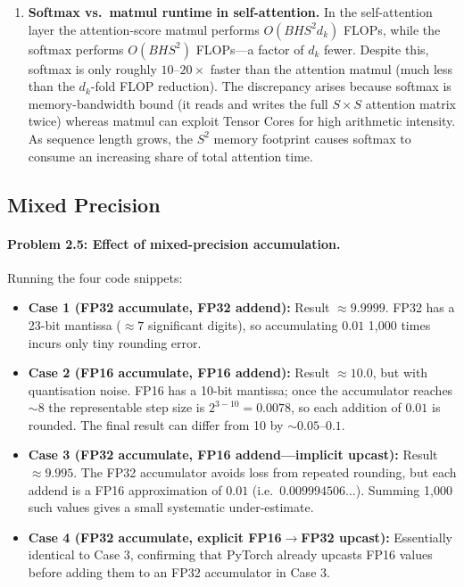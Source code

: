 \documentclass[11pt]{article}
\begin{document}
\begin{enumerate}
  \item \textbf{Softmax vs.\ matmul runtime in self-attention.}
        In the self-attention layer the attention-score matmul performs
        $O(B H S^2 d_k)$ FLOPs, while the softmax performs $O(B H S^2)$ FLOPs---a
        factor of $d_k$ fewer. Despite this, softmax is only roughly
        $10$--$20\times$ faster than the attention matmul (much less than the
        $d_k$-fold FLOP reduction). The discrepancy arises because softmax is
        memory-bandwidth bound (it reads and writes the full $S\times S$ attention
        matrix twice) whereas matmul can exploit Tensor Cores for high arithmetic
        intensity. As sequence length grows, the $S^2$ memory footprint causes
        softmax to consume an increasing share of total attention time.
\end{enumerate}

\subsection{Mixed Precision}

\paragraph{Problem 2.5: Effect of mixed-precision accumulation.}

Running the four code snippets:

\begin{itemize}
  \item \textbf{Case 1 (FP32 accumulate, FP32 addend):} Result $\approx 9.9999$. FP32
        has a 23-bit mantissa ($\approx 7$ significant digits), so accumulating
        $0.01$ 1{,}000 times incurs only tiny rounding error.
  \item \textbf{Case 2 (FP16 accumulate, FP16 addend):} Result $\approx 10.0$, but
        with quantisation noise. FP16 has a 10-bit mantissa; once the accumulator
        reaches $\sim 8$ the representable step size is $2^{3-10}=0.0078$, so each
        addition of $0.01$ is rounded. The final result can differ from 10 by
        $\sim 0.05$--$0.1$.
  \item \textbf{Case 3 (FP32 accumulate, FP16 addend---implicit upcast):} Result
        $\approx 9.995$. The FP32 accumulator avoids loss from repeated rounding, but
        each addend is a FP16 approximation of $0.01$
        (i.e.\ $0.009994506\ldots$). Summing 1{,}000 such values gives a small
        systematic under-estimate.
  \item \textbf{Case 4 (FP32 accumulate, explicit FP16$\to$FP32 upcast):} Essentially
        identical to Case 3, confirming that PyTorch already upcasts FP16 values
        before adding them to an FP32 accumulator in Case 3.
\end{itemize}
\end{document}
